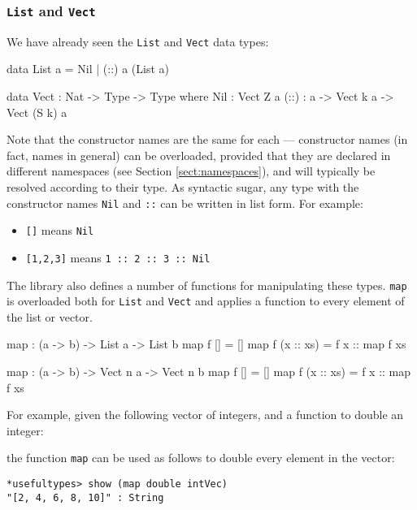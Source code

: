 \subsubsection{\texttt{List} and \texttt{Vect}}

We have already seen the \texttt{List} and \texttt{Vect} data types:

\begin{code}
data List a = Nil | (::) a (List a)

data Vect : Nat -> Type -> Type where
   Nil  : Vect Z a
   (::) : a -> Vect k a -> Vect (S k) a
\end{code}

\noindent
Note that the constructor names are the same for each --- constructor names (in fact, names in general) can be overloaded, provided that they are declared in different namespaces (see Section \ref{sect:namespaces}), and will typically be resolved according to their type.
As syntactic sugar, any type with the constructor names \texttt{Nil} and \texttt{::} can be written in list form. 
For example:

\begin{itemize}
\item \texttt{[]} means \texttt{Nil}
\item \texttt{[1,2,3]} means \texttt{1 :: 2 :: 3 :: Nil}
\end{itemize}

\noindent
The library also defines a number of functions for manipulating these types.
\texttt{map} is overloaded both for \texttt{List} and \texttt{Vect} and applies a function to every element of the list or vector.

\begin{code}
map : (a -> b) -> List a -> List b
map f []        = []
map f (x :: xs) = f x :: map f xs

map : (a -> b) -> Vect n a -> Vect n b
map f []        = []
map f (x :: xs) = f x :: map f xs
\end{code}


\noindent
For example, given the following vector of integers, and a function to double an integer:


\noindent
the function \texttt{map} can be used as follows to double every element in the vector:

\begin{lstlisting}[style=stdout]
*usefultypes> show (map double intVec) 
"[2, 4, 6, 8, 10]" : String
\end{lstlisting}

